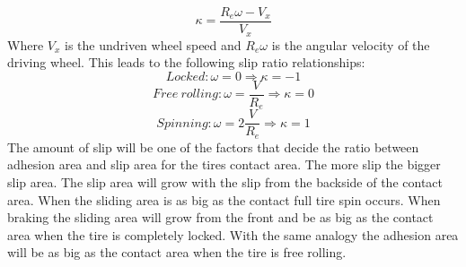 \begin{equation}
\kappa = \dfrac{R_{e}\omega-V_{x}}{V_{x}}
\label{eq:longslip}
\end{equation}
Where $ V_{x} $ is the undriven wheel speed and $ R_{e}\omega $ is the angular velocity of the driving wheel. This leads to the following slip ratio relationships:
\begin{equation}
Locked: \omega = 0 \Rightarrow \kappa = -1
\end{equation}
\begin{equation}
Free\: rolling: \omega = \frac{V}{R_{e}} \Rightarrow \kappa = 0
\end{equation}
\begin{equation}
Spinning: \omega = 2\frac{V}{R_{e}} \Rightarrow \kappa = 1
\end{equation}
The amount of slip will be one of the factors that decide the ratio between adhesion area and slip area for the tires contact area. The more slip the bigger slip area. The slip area will grow with the slip from the backside of the contact area. When the sliding area is as big as the contact full tire spin occurs. When braking the sliding area will grow from the front and be as big as the contact area when the tire is completely locked. With the same analogy the adhesion area will be as big as the contact area when the tire is free rolling. 

